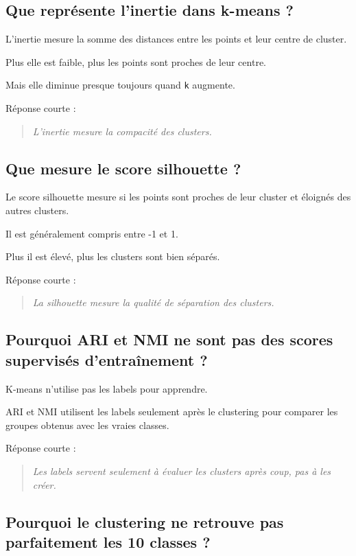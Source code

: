 \documentclass[11pt,a4paper]{article}
\begin{document}
\subsection{Que représente l'inertie dans k-means ?}

L'inertie mesure la somme des distances entre les points et leur centre de cluster.

Plus elle est faible, plus les points sont proches de leur centre.

Mais elle diminue presque toujours quand \texttt{k} augmente.

Réponse courte :

\begin{quote}
\itshape L'inertie mesure la compacité des clusters.
\end{quote}

\subsection{Que mesure le score silhouette ?}

Le score silhouette mesure si les points sont proches de leur cluster et éloignés des autres clusters.

Il est généralement compris entre -1 et 1.

Plus il est élevé, plus les clusters sont bien séparés.

Réponse courte :

\begin{quote}
\itshape La silhouette mesure la qualité de séparation des clusters.
\end{quote}

\subsection{Pourquoi ARI et NMI ne sont pas des scores supervisés d'entraînement ?}

K-means n'utilise pas les labels pour apprendre.

ARI et NMI utilisent les labels seulement après le clustering pour comparer les groupes obtenus avec les vraies classes.

Réponse courte :

\begin{quote}
\itshape Les labels servent seulement à évaluer les clusters après coup, pas à les créer.
\end{quote}

\subsection{Pourquoi le clustering ne retrouve pas parfaitement les 10 classes ?}
\end{document}
